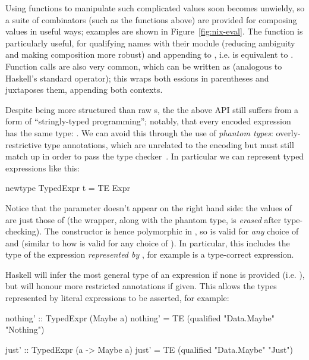 \begin{sloppypar}
  Using  functions to manipulate such complicated values soon becomes
  unwieldy, so a suite of combinators (such as the  functions above)
  are provided for composing  values in useful ways; examples are shown
  in Figure~\ref{fig:nix-eval}. The  function is particularly
  useful, for qualifying names with their module (reducing ambiguity and making
  composition more robust) and appending to , i.e.
   is equivalent to
  . Function calls are also very
  common, which can be written as  (analogous to Haskell's
  standard \hs{$} %
  operator); this wraps both essions in parentheses
  and juxtaposes them, appending both contexts.
\end{sloppypar}

Despite being more structured than raw s, the the above API still
suffers from a form of ``stringly-typed programming''; notably, that every
encoded expression has the same type: . We can avoid this through the
use of \emph{phantom types}: overly-restrictive type annotations, which are
unrelated to the encoding but must still match up in order to pass the type
checker~\cite[\S~5.1]{leijen1999domain}. In particular we can represent typed
expressions like this:

\begin{haskell}
newtype TypedExpr t = TE Expr
\end{haskell}

Notice that the parameter  doesn't appear on the right hand side: the
values of  are just those of  (the wrapper, along with
the phantom type, is \emph{erased} after type-checking). The  constructor
is hence polymorphic in , so  is valid for
\emph{any} choice of  and  (similar to how  is
valid for any choice of ). In particular, this includes the type of the
expression \emph{represented by} , for example
 is a type-correct expression.

Haskell will infer the most general type of an expression if none is provided
(i.e. ), but will honour more restricted annotations
if given. This allows the types represented by literal expressions to be
asserted, for example:

\begin{haskell}
nothing' :: TypedExpr (Maybe a)
nothing' = TE (qualified "Data.Maybe" "Nothing")

just' :: TypedExpr (a -> Maybe a)
just' = TE (qualified "Data.Maybe" "Just")
\end{haskell}

